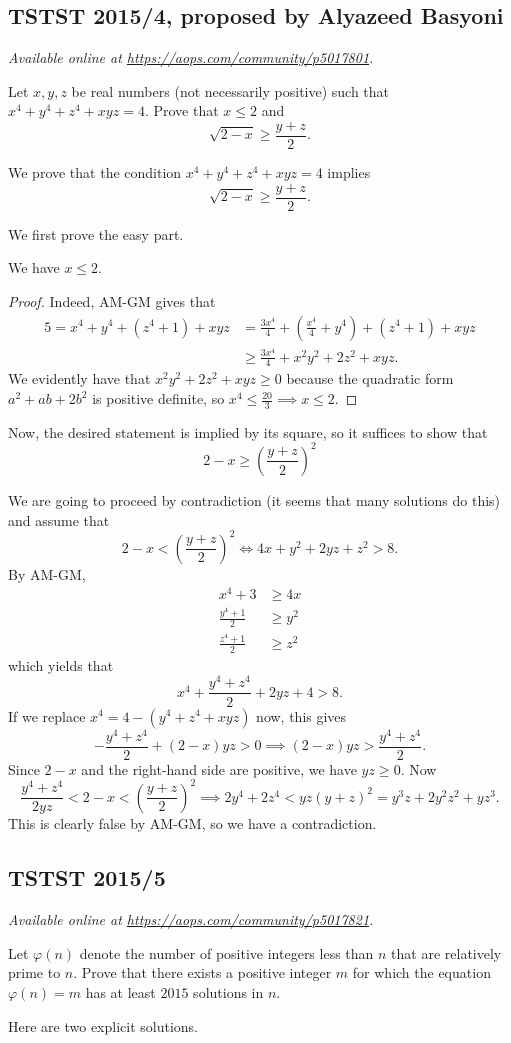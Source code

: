 \documentclass[11pt]{scrartcl}
\begin{document}
\subsection{TSTST 2015/4, proposed by Alyazeed Basyoni}
\textsl{Available online at \url{https://aops.com/community/p5017801}.}
\begin{mdframed}[style=mdpurplebox,frametitle={Problem statement}]
Let $x,y,z$ be real numbers (not necessarily positive)
such that $x^4 + y^4 + z^4 + xyz = 4$.
Prove that $x \le 2$ and \[ \sqrt{2-x} \ge \frac{y+z}{2}. \]
\end{mdframed}
We prove that the condition $x^4+y^4+z^4+xyz = 4$ implies
\[ \sqrt{2-x} \geq \frac{y+z}{2}. \]

We first prove the  easy part.
\begin{claim*}
  We have $x \le 2$.
\end{claim*}
\begin{proof}
  Indeed, AM-GM gives that
  \begin{align*}
    5 =x^4+y^4+(z^4+1)+xyz
      &= \frac{3x^4}{4}+\left(\frac{x^4}{4}+y^4\right)+(z^4+1)+xyz \\
      &\geq \frac{3x^4}{4}+x^2y^2+2z^2+xyz.
  \end{align*}
  We evidently have that $x^2y^2+2z^2+xyz \geq 0$ because the
  quadratic form $a^2+ab+2b^2$ is positive definite, so $x^4 \leq
  \frac{20}{3} \implies x \leq 2$.
\end{proof}
Now, the desired statement is
implied by its square, so it suffices to show that
\[ 2-x \geq \left(\frac{y+z}{2}\right)^2 \]

We are going to proceed by contradiction
(it seems that many solutions do this)
and assume that
\[ 2-x < \left( \frac{y+z}{2} \right)^2
  \iff 4x + y^2 + 2yz + z^2 > 8. \]
By AM-GM,
\begin{align*}
  x^4 + 3 & \ge 4x \\
  \tfrac{y^4+1}{2} &\ge y^2 \\
  \tfrac{z^4+1}{2} &\ge z^2
\end{align*}
which yields that
\[ x^4+\frac{y^4+z^4}{2}+2yz+4 > 8. \]
If we replace $x^4 = 4 - (y^4+z^4+xyz)$ now,
this gives
\[ -\frac{y^4+z^4}{2}+(2-x)yz > 0 \implies (2-x)yz > \frac{y^4+z^4}{2}. \]
Since $2-x$ and the right-hand side are positive,
we have $yz \geq 0$.
Now
\[ \frac{y^4+z^4}{2yz} < 2-x < \left(\frac{y+z}{2}\right)^2
  \implies 2y^4+2z^4 < yz(y+z)^2 = y^3z+2y^2z^2+yz^3. \]
This is clearly false by AM-GM, so we have a contradiction.
\pagebreak

\subsection{TSTST 2015/5}
\textsl{Available online at \url{https://aops.com/community/p5017821}.}
\begin{mdframed}[style=mdpurplebox,frametitle={Problem statement}]
Let $\varphi(n)$ denote the number of positive integers
less than $n$ that are relatively prime to $n$.
Prove that there exists a positive integer $m$ for which the equation
$\varphi(n) = m$ has at least $2015$ solutions in $n$.
\end{mdframed}
Here are two explicit solutions.
\end{document}
